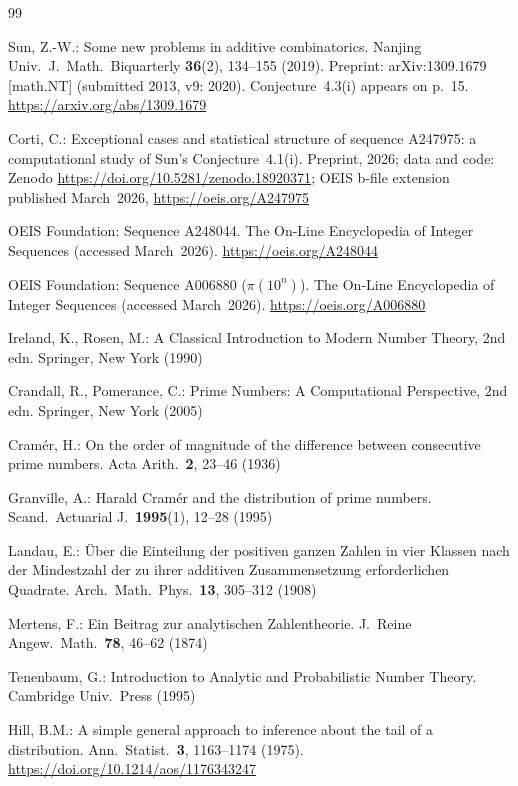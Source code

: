 \documentclass[11pt]{article}
\theoremstyle{definition}
\theoremstyle{remark}
\numberwithin{equation}{section}
\begin{document}
\begin{thebibliography}{99}
\sloppy
\raggedright

Sun, Z.-W.:
Some new problems in additive combinatorics.
Nanjing Univ.\ J.\ Math.\ Biquarterly \textbf{36}(2), 134--155
(2019).
Preprint: arXiv:1309.1679 [math.NT] (submitted 2013, v9: 2020).
Conjecture~4.3(i) appears on p.~15.
\url{https://arxiv.org/abs/1309.1679}

Corti, C.:
Exceptional cases and statistical structure of sequence A247975:
a computational study of Sun's Conjecture~4.1(i).
Preprint, 2026; data and code: Zenodo
\url{https://doi.org/10.5281/zenodo.18920371};
OEIS b-file extension published March~2026,
\url{https://oeis.org/A247975}

OEIS Foundation:
Sequence A248044.
The On-Line Encyclopedia of Integer Sequences
(accessed March~2026).
\url{https://oeis.org/A248044}

OEIS Foundation:
Sequence A006880 ($\pi(10^n)$).
The On-Line Encyclopedia of Integer Sequences
(accessed March~2026).
\url{https://oeis.org/A006880}

Ireland, K., Rosen, M.:
A Classical Introduction to Modern Number Theory,
2nd edn. Springer, New York (1990)

Crandall, R., Pomerance, C.:
Prime Numbers: A Computational Perspective,
2nd edn. Springer, New York (2005)

Cram\'er, H.:
On the order of magnitude of the difference between
consecutive prime numbers.
Acta Arith.\ \textbf{2}, 23--46 (1936)

Granville, A.:
Harald Cram\'er and the distribution of prime numbers.
Scand.\ Actuarial J.\ \textbf{1995}(1), 12--28 (1995)

Landau, E.:
\"Uber die Einteilung der positiven ganzen Zahlen in vier
Klassen nach der Mindestzahl der zu ihrer additiven Zusammensetzung
erforderlichen Quadrate.
Arch.\ Math.\ Phys.\ \textbf{13}, 305--312 (1908)

Mertens, F.:
Ein Beitrag zur analytischen Zahlentheorie.
J.\ Reine Angew.\ Math.\ \textbf{78}, 46--62 (1874)

Tenenbaum, G.:
Introduction to Analytic and Probabilistic Number Theory.
Cambridge Univ.\ Press (1995)

Hill, B.M.:
A simple general approach to inference about the tail of a
distribution.
Ann.\ Statist.\ \textbf{3}, 1163--1174 (1975).
\url{https://doi.org/10.1214/aos/1176343247}


\end{thebibliography}
\end{document}
